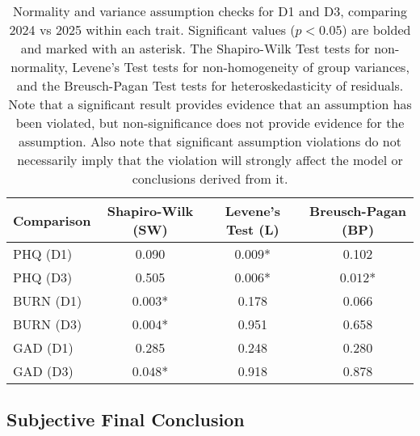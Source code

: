 \documentclass{article}
\begin{document}
\begin{table}[H]
    \centering
    \begin{tabular}{lccc}
    \hline
    Comparison & Shapiro-Wilk (SW) & Levene's Test (L) & Breusch-Pagan (BP) \\
    \hline
    PHQ (D1) & 0.090 & $\mathbf{0.009}$* & 0.102 \\
    PHQ (D3) & 0.505 & $\mathbf{0.006}$* & $\mathbf{0.012}$* \\
    BURN (D1) & $\mathbf{0.003}$* & 0.178 & 0.066 \\
    BURN (D3) & $\mathbf{0.004}$* & 0.951 & 0.658 \\
    GAD (D1) & 0.285 & 0.248 & 0.280 \\
    GAD (D3) & $\mathbf{0.048}$* & 0.918 & 0.878 \\
    \hline
    \end{tabular}
    \caption{Normality and variance assumption checks for D1 and D3, comparing 2024 vs 2025 within each trait. Significant values ($p < 0.05$) are bolded and marked with an asterisk. The Shapiro-Wilk Test tests for non-normality, Levene's Test tests for non-homogeneity of group variances, and the Breusch-Pagan Test tests for heteroskedasticity of residuals. Note that a significant result provides evidence that an assumption has been violated, but non-significance does not provide evidence for the assumption. Also note that significant assumption violations do not necessarily imply that the violation will strongly affect the model or conclusions derived from it.}
    \label{tab:acrossYearAssump}
\end{table}

\subsection{Subjective Final Conclusion}
\end{document}

